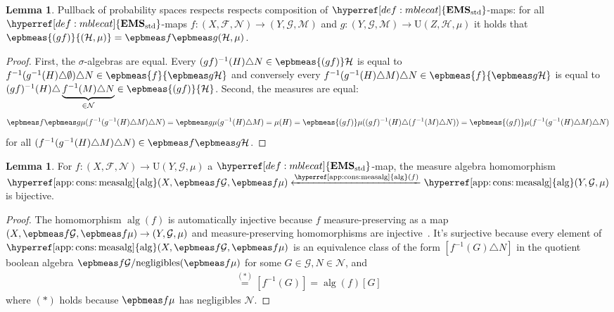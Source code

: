 \documentclass[
  sigconf,
  screen, ]{acmart}
\theoremstyle{definition}
\newtheorem{lemma}[theorem]{Lemma}
\newcommand\calF{\mathcal F}
\newcommand\calG{\mathcal G}
\newcommand\calH{\mathcal H}
\newcommand\calM{\mathcal M}
\newcommand\calN{\mathcal N}
\newcommand\fremlinf[3]{\cite[\href{https://www1.essex.ac.uk/maths/people/fremlin/chap#2.pdf\#page=#3}{#1}]{fremlin2000measure}}
\newcommand\nref[2]{\hyperref[#1]{#2}} \newcommand\checkhigh{{\huge{\color{red}\textbf{TODO: check}}}}
\newcommand\measalg{\operatorname{\nref{app:cons:measalg}{alg}}}
\newcommand\negligibles{\mathrm{negligibles}}
\newcommand\texforgetmu{\mathrm{U}}
\newcommand\forgetmu{{\nref{def:forgetmu}{\texforgetmu}}}
\newcommand\texStdMble{\mathbf{EMS}_{\rm std}}
\newcommand\StdMble{{\nref{def:mblecat}{\texStdMble}}}
\begin{document}
\begin{lemma} \label{app:lem:epb-functorial}
  Pullback of probability spaces respects
  respects composition of $\StdMble$-maps:
  for all $\StdMble$-maps
  $f : (X,\calF,\calN)\to (Y,\calG,\calM)$
  and $g : (Y,\calG,\calM)\to\forgetmu(Z,\calH,\mu)$
  it holds that $\epbmeas{(gf)}{(\calH,\mu)}
  = \epbmeas f{\epbmeas g{(\calH,\mu)}}$.
\end{lemma}
\begin{proof}
  First, the $\sigma$-algebras are equal.
  Every $(gf)^{-1}(H)\triangle N\in \epbmeas{(gf)}\calH$
  is equal to $f^{-1}(g^{-1}(H)\triangle\emptyset)\triangle N\in\epbmeas{f}{\epbmeas g\calH}$
  and conversely every $f^{-1}(g^{-1}(H)\triangle M)\triangle N\in\epbmeas{f}{\epbmeas g\calH}$
  is equal to $(gf)^{-1}(H)\triangle \underbrace{f^{-1}(M)\triangle N}_{\in\calN}\in\epbmeas{(gf)}{\calH}$.
  Second, the measures are equal:
  \begin{align*}
    \epbmeas f{\epbmeas g\mu}(f^{-1}(g^{-1}(H)\triangle M)\triangle N)
    =\epbmeas g\mu(g^{-1}(H)\triangle M)
    =\mu(H)
    =\epbmeas {(gf)}\mu((gf)^{-1}(H)\triangle (f^{-1}(M)\triangle N))
    =\epbmeas {(gf)}\mu(f^{-1}(g^{-1}(H)\triangle M)\triangle N)
  \end{align*}
  for all $(f^{-1}(g^{-1}(H)\triangle M)\triangle N)\in\epbmeas f{\epbmeas g\calH}$.
\end{proof}

\begin{lemma} \label{app:lem:epb-bij-hom}
  For $f : (X,\calF,\calN)\to\forgetmu(Y,\calG,\mu)$
  a $\StdMble$-map,
  the measure algebra homomorphism
  $\measalg(X,\epbmeas f\calG,\epbmeas f \mu)\xleftarrow{\measalg(f)}\measalg(Y,\calG,\mu)$
  is bijective.
\end{lemma}
\begin{proof}
  The homomorphism $\measalg(f)$ is automatically injective
  because $f$ measure-preserving as a map $(X,\epbmeas f\calG,\epbmeas f\mu)\to(Y,\calG,\mu)$
  and measure-preserving homomorphisms are injective~\fremlinf{324K(a)}{32}{25}.
  It's surjective because every element of $\measalg(X,\epbmeas f \calG,\epbmeas f\mu)$
  is an equivalence class
  of the form $[f^{-1}(G)\triangle N]$
  in the quotient boolean algebra $\epbmeas f \calG/\negligibles(\epbmeas f \mu)$
  for some $G\in\calG,N\in\calN$,
  and \begin{align*}
    [f^{-1}(G)\triangle N]
    \stackrel{(*)}= [f^{-1}(G)]
    = \measalg(f)[G]
  \end{align*}
  where $(*)$ holds because $\epbmeas f\mu$ has negligibles $\calN$.
\end{proof}
\end{document}
